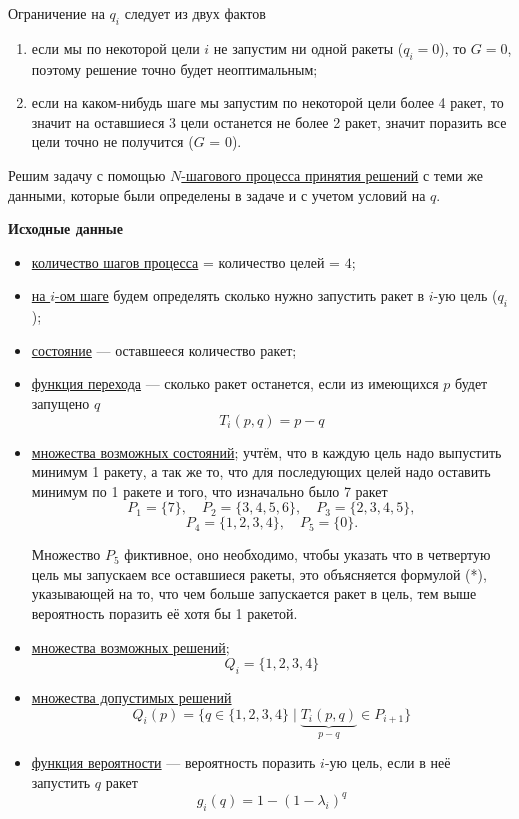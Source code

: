 Ограничение на $q_i$ следует из двух фактов

\begin{enumerate}[nosep]
	\item если мы по некоторой цели $i$ не запустим ни одной ракеты ($q_i = 0$), то $G = 0$, поэтому решение точно будет неоптимальным;
	
	\item если на каком-нибудь шаге мы запустим по некоторой цели более 4 ракет, то значит на оставшиеся 3 цели останется не более 2 ракет, значит поразить все цели точно не получится ($G$ = 0).
\end{enumerate}

\solution

Решим задачу с помощью \hyperref[def:n_step_process]{$N$-шагового процесса принятия решений} с теми же данными, которые были определены в задаче и с учетом условий на $q$.

\bigskip

\textbf{Исходные данные}
\begin{itemize}[nosep]
	\item \underline{количество шагов процесса} = количество целей = $4$;
	
	\item \underline{на $i$-ом шаге} будем определять сколько нужно запустить ракет в $i$-ую цель ($q_i$);
	
	\item \underline{состояние} --- оставшееся количество ракет;
	
	\item \underline{функция перехода} --- сколько ракет останется, если из имеющихся $p$ будет запущено $q$
	\[T_i(p, q) = p - q\]
	
	\item \underline{множества возможных состояний}; учтём, что в каждую цель надо выпустить минимум 1 ракету, а так же то, что для последующих целей надо оставить минимум по 1 ракете и того, что изначально было 7 ракет
	\[
	P_1 = \{7\}, \quad P_2 = \{3, 4, 5, 6\}, \quad P_3 = \{2, 3, 4, 5\},
	\]
	\[
	P_4 = \{1, 2, 3, 4\}, \quad P_5 = \{0\}.
	\]
	
	Множество $P_5$ фиктивное, оно необходимо, чтобы указать что в четвертую цель мы запускаем все оставшиеся ракеты, это объясняется формулой (*), указывающей на то, что чем больше запускается ракет в цель, тем выше вероятность поразить её хотя бы 1 ракетой.
	
	\item \underline{множества возможных решений};
	\[Q_i = \{1, 2, 3, 4\}\]
	
	\item \underline{множества допустимых решений}
	\[Q_i(p) = \{q \in \{1, 2, 3, 4\} \; \big| \; \underbrace{T_i(p, q)}_{p - q} \in P_{i + 1} \}\]
	
	\item \underline{функция вероятности} --- вероятность поразить $i$-ую цель, если в неё запустить $q$ ракет
	\[g_i(q) = 1 - (1 - \lambda_i)^{q}\]
\end{itemize}

